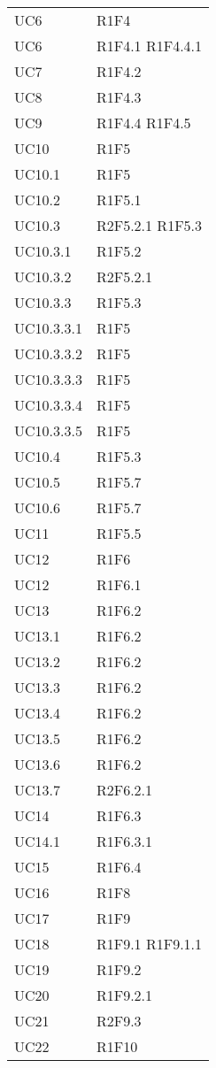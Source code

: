 {\begin{longtable}{C{4cm} C{11.5cm}}
UC6 & R1F4 \\
UC6 & R1F4.1 \quad R1F4.4.1\\
UC7 & R1F4.2 \\
UC8 & R1F4.3 \\

UC9 & R1F4.4 \quad R1F4.5 \\

UC10 & R1F5 \\
UC10.1 & R1F5 \\
UC10.2 & R1F5.1 \\
UC10.3 & R2F5.2.1 \quad R1F5.3\\
UC10.3.1 & R1F5.2 \\
UC10.3.2 & R2F5.2.1 \\
UC10.3.3 & R1F5.3 \\
UC10.3.3.1 & R1F5 \\
UC10.3.3.2 & R1F5 \\
UC10.3.3.3 & R1F5 \\
UC10.3.3.4 & R1F5 \\
UC10.3.3.5 & R1F5 \\
UC10.4 & R1F5.3 \\
UC10.5 & R1F5.7 \\
UC10.6 & R1F5.7 \\
UC11 & R1F5.5 \\

UC12 & R1F6 \\
UC12 & R1F6.1 \\
UC13 & R1F6.2 \\
UC13.1 & R1F6.2 \\
UC13.2 & R1F6.2 \\
UC13.3 & R1F6.2 \\
UC13.4 & R1F6.2 \\
UC13.5 & R1F6.2 \\
UC13.6 & R1F6.2 \\
UC13.7 & R2F6.2.1 \\
UC14 & R1F6.3 \\
UC14.1 & R1F6.3.1 \\
UC15 & R1F6.4 \\

UC16 & R1F8 \\

UC17 & R1F9 \\

UC18 & R1F9.1 \quad R1F9.1.1 \\
UC19 & R1F9.2 \\
UC20 & R1F9.2.1 \\
UC21 & R2F9.3 \\
UC22 & R1F10 \\


\end{longtable}}
